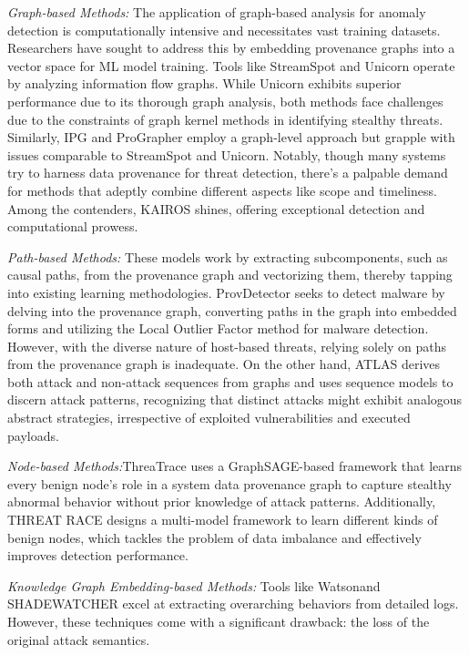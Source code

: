 \textit{Graph-based Methods:} The application of graph-based analysis for anomaly detection is computationally intensive and necessitates vast training datasets. Researchers have sought to address this by embedding provenance graphs into a vector space for ML model training. Tools like StreamSpot \cite{manzoor2016fast} and Unicorn \cite{han2020unicorn} operate by analyzing information flow graphs. While Unicorn exhibits superior performance due to its thorough graph analysis, both methods face challenges due to the constraints of graph kernel methods in identifying stealthy threats. Similarly, IPG \cite{li2021hierarchical} and ProGrapher \cite{yang2023prographer} employ a graph-level approach but grapple with issues comparable to StreamSpot and Unicorn. Notably, though many systems try to harness data provenance for threat detection, there's a palpable demand for methods that adeptly combine different aspects like scope and timeliness. Among the contenders, KAIROS \cite{cheng2023kairos} shines, offering exceptional detection and computational prowess. 

\textit{Path-based Methods:} These models work by extracting subcomponents, such as causal paths, from the provenance graph and vectorizing them, thereby tapping into existing learning methodologies. ProvDetector \cite{wang2020you} seeks to detect malware by delving into the provenance graph, converting paths in the graph into embedded forms and utilizing the Local Outlier Factor method for malware detection. However, with the diverse nature of host-based threats, relying solely on paths from the provenance graph is inadequate. On the other hand, ATLAS \cite{alsaheel2021atlas} derives both attack and non-attack sequences from graphs and uses sequence models to discern attack patterns, recognizing that distinct attacks might exhibit analogous abstract strategies, irrespective of exploited vulnerabilities and executed payloads.

\textit{Node-based Methods:}ThreaTrace \cite{wang2022threatrace} uses a GraphSAGE-based framework that learns every benign node's role in a system data provenance graph to capture stealthy abnormal behavior without prior knowledge of attack patterns. Additionally, THREAT RACE designs a multi-model framework to learn different kinds of benign nodes, which tackles the problem of data imbalance and effectively improves detection performance. 

\textit{Knowledge Graph Embedding-based Methods:} Tools like Watson\cite{zeng2021watson}and SHADEWATCHER \cite{zengy2022shadewatcher} excel at extracting overarching behaviors from detailed logs. However, these techniques come with a significant drawback: the loss of the original attack semantics.

